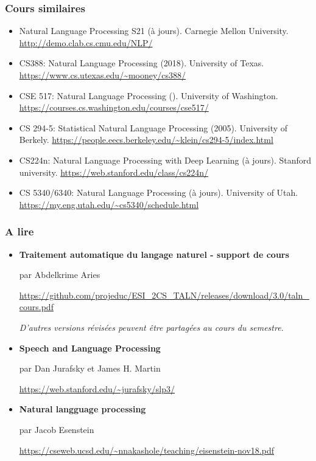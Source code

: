 \documentclass{beamer}
\begin{document}
\begin{frame}
	\frametitle{Cours similaires}
	
	\begin{itemize}
		
		\item Natural Language Processing S21 (à jours).
		Carnegie Mellon University. 
		\url{http://demo.clab.cs.cmu.edu/NLP/}
		
		\item CS388: Natural Language Processing (2018). 
		University of Texas. 
		\url{https://www.cs.utexas.edu/~mooney/cs388/}
		
		\item CSE 517: Natural Language Processing ().
		University of Washington.
		\url{https://courses.cs.washington.edu/courses/cse517/}
		
		\item CS 294-5: Statistical Natural Language Processing (2005). 
		University of Berkely. 
		\url{https://people.eecs.berkeley.edu/~klein/cs294-5/index.html}
		
		\item CS224n: Natural Language Processing with Deep Learning (à jours).
		Stanford university.
		\url{https://web.stanford.edu/class/cs224n/}
		
		\item CS 5340/6340: Natural Language Processing (à jours). 
		University of Utah.
		\url{https://my.eng.utah.edu/~cs5340/schedule.html}
		
	\end{itemize}
	
\end{frame}

\begin{frame}
	\frametitle{A lire}
	
	\begin{itemize}
		
		\item \textbf{Traitement automatique du langage naturel - support de cours}
		
		par Abdelkrime Aries
		
		\url{https://github.com/projeduc/ESI_2CS_TALN/releases/download/3.0/taln_cours.pdf}
		
		\textit{\color{red}D'autres versions révisées peuvent être partagées au cours du semestre.}
		
		\item \textbf{Speech and Language Processing} 
		
		par Dan Jurafsky et James H. Martin
		
		\url{https://web.stanford.edu/~jurafsky/slp3/}
		
		\item \textbf{Natural langguage processing}
		
		par Jacob Esenstein 
		
		\url{https://cseweb.ucsd.edu/~nnakashole/teaching/eisenstein-nov18.pdf}
		
		
	\end{itemize}
	
\end{frame}
\end{document}
